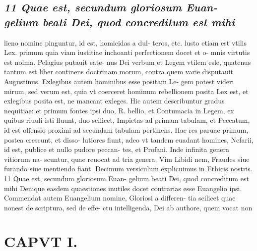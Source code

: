 \documentclass{article}
\begin{document}
\begin{pages}
\subsection*{\textit{11 Quae est, secundum gloriosum Euan- gelium beati Dei, quod concreditum est mihi}}lieno nomine pinguntur, id est, homicidas a dul- teros, etc. lusto etiam est vtilis Lex. primum quia viam iustitiae inchoanti perfectionem docet et o- mnis virtutis est noima. Pelagius putauit eate- nus Dei verbum et Legem vtilem esle, quatenus tantum est liber continens doctrinam morum, contra quem varie disputauit Augustinus. Exlegibus autem hominibus esse positam Le- gem potest videri mirum, sed verum est, quia vt coerceret hominum rebellionem posita Lex est, et exlegibus posita est, ne mancant exleges. Hic autem describuntur gradus nequitiae: et primum fontes ipsi duo, R. bellio, et Contumacia in Legem, ex quibus riuuli isti fluunt, duo scilicet, Impietas ad primam tabulam, et Peccatum, id est offensio proximi ad secundam tabulam pertinens. Hae res paruae primum, postea crescunt, et disso- lutiores fiunt, adeo vt tandem euadant homines, Nefarii, id est, publice et nullo pudore peccan- tes, et Profani. Inde infinita genera vitiorum na- scuntur, quae reuocat ad tria genera, Vim Libidi nem, Fraudes siue furando siue mentiendo fiant. Decimum versiculum explicuimus in Ethicis nostris. 11 Quae est, secundum gloriosum Euan- gelium beati Dei, quod concreditum est mihi Denique easdem quaestiones inutiles docet contrarias esse Euangelio ipsi. Commendat autem Euangelium nomine, Gloriosi a differen- tia scilicet quae nonest de scriptura, sed de effe- ctu intelligenda, Dei ab authore, quem vocat non  \pend
\section*{CAPVT  I. }
\marginpar{[ p.23 ]}\pstart {}
{}

\end{pages}
\end{document}
